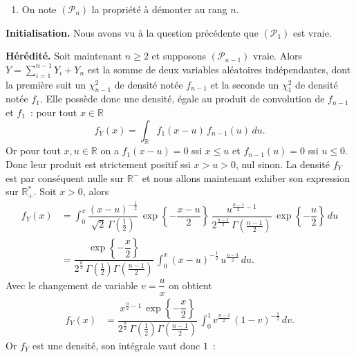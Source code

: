\begin{enumerate}
\def\labelenumi{\arabic{enumi}.}
\setcounter{enumi}{1}
\tightlist
\item
  On note \((\mathcal{P}_n)\) la propriété à démonter au rang \(n\).
\end{enumerate}

\textbf{Initialisation.} Nous avons vu à la question précédente que
\((\mathcal{P}_1)\) est vraie.

\textbf{Hérédité.} Soit maintenant \(n \geq 2\) et supposons
\((\mathcal{P}_{n-1})\) vraie. Alors \(Y = \sum_{i = 1}^{n-1}Y_i + Y_n\)
est la somme de deux variables aléatoires indépendantes, dont la
première suit un \(\chi_{n-1}^2\) de densité notée \(f_{n-1}\) et la
seconde un \(\chi_1^2\) de densité notée \(f_1\). Elle possède donc une
densité, égale au produit de convolution de \(f_{n-1}\) et \(f_1\)~:
pour tout \(x\in\mathbb{R}\)
\[f_Y(x) = \int_{\mathbb{R}} f_1(x-u)\,f_{n-1}(u)\,du.\] Or pour tout
\(x,u\in\mathbb{R}\) on a \(f_1(x-u) = 0\) ssi \(x \leq u\) et
\(f_{n-1}(u) = 0\) ssi \(u \leq 0\). Donc leur produit est strictement
positif ssi \(x > u > 0\), nul sinon. La densité \(f_Y\) est par
conséquent nulle sur \(\mathbb{R}^-\) et nous allons maintenant exhiber
son expression sur \(\mathbb{R}_+^\ast\). Soit \(x > 0\), alors
\begin{align*}
f_Y(x) &= \int_{0}^{x} \dfrac{(x-u)^{-\frac{1}{2}}}{\sqrt{2}\,\Gamma\left(\frac{1}{2}\right)}\,\exp\left\{-\dfrac{x-u}{2}\right\}\,\dfrac{u^{\frac{n-1}{2}-1}}{2^{\frac{n-1}{2}}\,\Gamma\left(\frac{n-1}{2}\right)}\,\exp\left\{-\dfrac{u}{2}\right\} \,du\\
&= \dfrac{\exp\left\{-\dfrac{x}{2} \right\}}{2^{\frac{n}{2}}\,\Gamma\left(\frac{1}{2}\right)\Gamma\left(\frac{n-1}{2}\right)} \,\int_0^x \left(x-u\right)^{-\frac{1}{2}}\,u^{\frac{n-3}{2}}\,du.
\end{align*} Avec le changement de variable \(v=\dfrac{u}{x}\) on
obtient \begin{align*}
f_Y(x) &= \dfrac{x^{\frac{n}{2}-1}\,\exp\left\{-\dfrac{x}{2} \right\}}{2^{\frac{n}{2}}\,\Gamma\left(\frac{1}{2}\right)\Gamma\left(\frac{n-1}{2}\right)} \,\int_0^{1} v^{\frac{n-3}{2}}\,\left(1 - v\right)^{-\frac{1}{2}} \,dv.
\end{align*} Or \(f_Y\) est une densité, son intégrale vaut donc \(1\)~:
